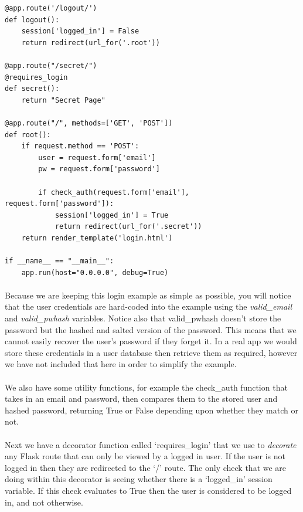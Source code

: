 \documentclass[12pt, a4paper, oneside]{book}
\begin{document}
{\begin{lstlisting}
@app.route('/logout/')
def logout():
    session['logged_in'] = False
    return redirect(url_for('.root'))

@app.route("/secret/")
@requires_login
def secret():
    return "Secret Page"

@app.route("/", methods=['GET', 'POST'])
def root():
    if request.method == 'POST':
        user = request.form['email']
        pw = request.form['password']
        
        if check_auth(request.form['email'], request.form['password']):
            session['logged_in'] = True
            return redirect(url_for('.secret'))
    return render_template('login.html')

if __name__ == "__main__":
    app.run(host="0.0.0.0", debug=True)
\end{lstlisting}

\paragraph{} Because we are keeping this login example as simple as possible, you will notice that the user credentials are hard-coded into the example using the \emph{valid\_email} and \emph{valid\_pwhash} variables. Notice also that valid\_pwhash doesn't store the password but the hashed and salted version of the password. This means that we cannot easily recover the user's password if they forget it. In a real app we would store these credentials in a user database then retrieve them as required, however we have not included that here in order to simplify the example.

\paragraph{} We also have some utility functions, for example the check\_auth function that takes in an email and password, then compares them to the stored user and hashed password, returning True or False depending upon whether they match or not. 
\paragraph{} Next we have a decorator function called `requires\_login' that we use to \emph{decorate} any Flask route that can only be viewed by a logged in user. If the user is not logged in then they are redirected to the `/' route. The only check that we are doing within this decorator is seeing whether there is a `logged\_in' session variable. If this check evaluates to True then the user is considered to be logged in, and not otherwise.

}
\end{document}
